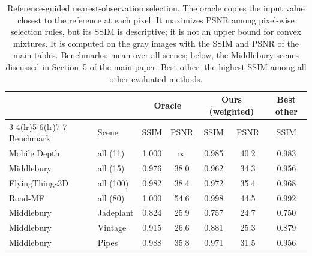 \begin{table}[t]
\centering
\scriptsize
\setlength{\tabcolsep}{4pt}
\caption{Reference-guided nearest-observation selection. The oracle copies the input value closest to the reference at each pixel. It maximizes PSNR among pixel-wise selection rules, but its SSIM is descriptive; it is not an upper bound for convex mixtures. It is computed on the gray images with the SSIM and PSNR of the main tables. Benchmarks: mean over all scenes; below, the Middlebury scenes discussed in Section~5 of the main paper. Best other: the highest SSIM among all other evaluated methods.}
\label{tab:supp_oracle}
\begin{tabular}{llccccc}
\toprule
 & & \multicolumn{2}{c}{Oracle} & \multicolumn{2}{c}{Ours (weighted)} & Best other \\
\cmidrule(lr){3-4}\cmidrule(lr){5-6}\cmidrule(lr){7-7}
Benchmark & Scene & SSIM & PSNR & SSIM & PSNR & SSIM \\
\midrule
Mobile Depth & all (11) & 1.000 & $\infty$ & 0.985 & 40.2 & 0.983 \\
Middlebury & all (15) & 0.976 & 38.0 & 0.962 & 34.3 & 0.956 \\
FlyingThings3D & all (100) & 0.982 & 38.4 & 0.972 & 35.4 & 0.968 \\
Road-MF & all (80) & 1.000 & 54.6 & 0.998 & 44.5 & 0.992 \\
\midrule
Middlebury & Jadeplant & 0.824 & 25.9 & 0.757 & 24.7 & 0.750 \\
Middlebury & Vintage & 0.915 & 26.6 & 0.881 & 25.3 & 0.879 \\
Middlebury & Pipes & 0.988 & 35.8 & 0.971 & 31.5 & 0.956 \\
\bottomrule
\end{tabular}
\end{table}
